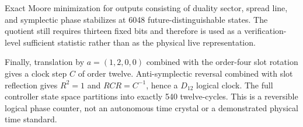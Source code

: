 Exact Moore minimization for outputs consisting of duality sector, spread line, and
symplectic phase stabilizes at 6048 future-distinguishable states.  The quotient still
requires thirteen fixed bits and therefore is used as a verification-level sufficient
statistic rather than as the physical live representation.

Finally, translation by $a=(1,2,0,0)$ combined with the order-four slot rotation gives
a clock step $C$ of order twelve.  Anti-symplectic reversal combined with slot
reflection gives $R^2=1$ and $RCR=C^{-1}$, hence a $D_{12}$ logical clock.  The full
controller state space partitions into exactly 540 twelve-cycles.  This is a reversible
logical phase counter, not an autonomous time crystal or a demonstrated physical time
standard.
